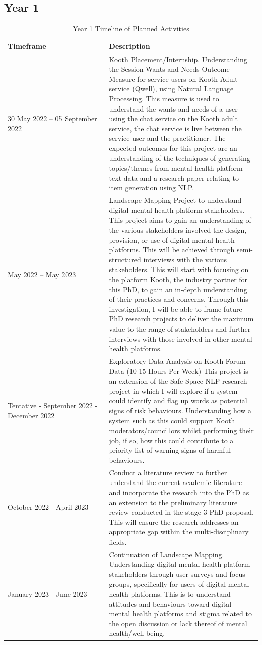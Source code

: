 \documentclass[12pt]{article}
\begin{document}
\subsection*{Year 1}
\centering
 \begin{longtable}{p{0.4\linewidth} | p{0.6\linewidth}}
    \caption{Year 1 Timeline of Planned Activities}
    \hline
      Timeframe  & Description \\ \hline
      30 May 2022 – 05 September 2022 & Kooth Placement/Internship. Understanding the Session Wants and Needs Outcome Measure for service users on Kooth Adult service (Qwell), using Natural Language Processing. This measure is used to understand the wants and needs of a user using the chat service on the Kooth adult service, the chat service is live between the service user and the practitioner. The expected outcomes for this project are an understanding of the techniques of generating topics/themes from mental health platform text data and a research paper relating to item generation using NLP. \\
      \hline
      May 2022 – May 2023& Landscape Mapping Project to understand digital mental health platform stakeholders. This project aims to gain an understanding of the various stakeholders involved the design, provision, or use of digital mental health platforms. This will be achieved through semi-structured interviews with the various stakeholders. This will start with focusing on the platform Kooth, the industry partner for this PhD, to gain an in-depth understanding of their practices and concerns.  Through this investigation, I will be able to frame future PhD research projects to deliver the maximum value to the range of stakeholders and further interviews with those involved in other mental health platforms.\\
      \hline
      Tentative - September 2022 - December 2022 & Exploratory Data Analysis on Kooth Forum Data (10-15 Hours Per Week) This project is an extension of the Safe Space NLP research project in which I will explore if a system could identify and flag up words as potential signs of risk behaviours. Understanding how a system such as this could support Kooth moderators/councillors whilst performing their job, if so, how this could contribute to a priority list of warning signs of harmful behaviours.\\
      \hline
      October 2022 - April 2023 & Conduct a literature review to further understand the current academic literature and incorporate the research into the PhD as an extension to the preliminary literature review conducted in the stage 3 PhD proposal. This will ensure the research addresses an appropriate gap within the multi-disciplinary fields.\\
      \hline
      January 2023 - June 2023&Continuation of Landscape Mapping. Understanding digital mental health platform stakeholders through user surveys and focus groups, specifically for users of digital mental health platforms. This is to understand attitudes and behaviours toward digital mental health platforms and stigma related to the open discussion or lack thereof of mental health/well-being.\\
      \hline
    \end{longtable}
    \label{tab:y1timeline}
\end{document}
